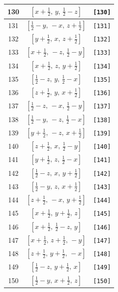 \documentclass[fleqn,8pt]{jsarticle}
\begin{document}
\begin{longtable}{ccc}
130 & $\left[ x + \frac{1}{2},\, y,\, \frac{1}{2} - z \right]$ & {\tt [130]} \\ \hline
131 & $\left[ \frac{1}{2} - y,\, - x,\, z + \frac{1}{2} \right]$ & {\tt [131]} \\ \hline
132 & $\left[ y + \frac{1}{2},\, x,\, z + \frac{1}{2} \right]$ & {\tt [132]} \\ \hline
133 & $\left[ x + \frac{1}{2},\, - z,\, \frac{1}{2} - y \right]$ & {\tt [133]} \\ \hline
134 & $\left[ x + \frac{1}{2},\, z,\, y + \frac{1}{2} \right]$ & {\tt [134]} \\ \hline
135 & $\left[ \frac{1}{2} - z,\, y,\, \frac{1}{2} - x \right]$ & {\tt [135]} \\ \hline
136 & $\left[ z + \frac{1}{2},\, y,\, x + \frac{1}{2} \right]$ & {\tt [136]} \\ \hline
137 & $\left[ \frac{1}{2} - z,\, - x,\, \frac{1}{2} - y \right]$ & {\tt [137]} \\ \hline
138 & $\left[ \frac{1}{2} - y,\, - z,\, \frac{1}{2} - x \right]$ & {\tt [138]} \\ \hline
139 & $\left[ y + \frac{1}{2},\, - z,\, x + \frac{1}{2} \right]$ & {\tt [139]} \\ \hline
140 & $\left[ z + \frac{1}{2},\, x,\, \frac{1}{2} - y \right]$ & {\tt [140]} \\ \hline
141 & $\left[ y + \frac{1}{2},\, z,\, \frac{1}{2} - x \right]$ & {\tt [141]} \\ \hline
142 & $\left[ \frac{1}{2} - z,\, x,\, y + \frac{1}{2} \right]$ & {\tt [142]} \\ \hline
143 & $\left[ \frac{1}{2} - y,\, z,\, x + \frac{1}{2} \right]$ & {\tt [143]} \\ \hline
144 & $\left[ z + \frac{1}{2},\, - x,\, y + \frac{1}{2} \right]$ & {\tt [144]} \\ \hline
145 & $\left[ x + \frac{1}{2},\, y + \frac{1}{2},\, z \right]$ & {\tt [145]} \\ \hline
146 & $\left[ x + \frac{1}{2},\, \frac{1}{2} - z,\, y \right]$ & {\tt [146]} \\ \hline
147 & $\left[ x + \frac{1}{2},\, z + \frac{1}{2},\, - y \right]$ & {\tt [147]} \\ \hline
148 & $\left[ z + \frac{1}{2},\, y + \frac{1}{2},\, - x \right]$ & {\tt [148]} \\ \hline
149 & $\left[ \frac{1}{2} - z,\, y + \frac{1}{2},\, x \right]$ & {\tt [149]} \\ \hline
150 & $\left[ \frac{1}{2} - y,\, x + \frac{1}{2},\, z \right]$ & {\tt [150]} \\ \hline

\end{longtable}
\end{document}
